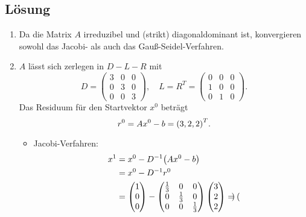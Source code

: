 \documentclass{exercise}
\begin{document}
    \subsection*{Lösung}
    \begin{enumerate}
        \item Da die Matrix \(A\) irreduzibel und (strikt) diagonaldominant ist, konvergieren sowohl das Jacobi- als auch das Gauß-Seidel-Verfahren.
        \item \(A\) lässt sich zerlegen in \(D - L - R\) mit
        \[
            D = \begin{pmatrix}
                3 & 0 & 0\\
                0 & 3 & 0\\
                0 & 0 & 3
            \end{pmatrix}, \quad L = R^T = \begin{pmatrix}
                0 & 0 & 0\\
                1 & 0 & 0\\
                0 & 1 & 0
            \end{pmatrix}.
        \]
        Das Residuum für den Startvektor \(x^0\) beträgt
        \[
            r^0 = Ax^0 - b = \parentheses*{3, 2, 2}^T.
        \]
        \begin{itemize}
            \item Jacobi-Verfahren:
            \begin{align*}
                x^1 &= x^0 - D^{-1}\parentheses*{Ax^0 - b}\\
                &= x^0 - D^{-1}r^0\\
                &= \begin{pmatrix}
                    1\\
                    0\\
                    0
                \end{pmatrix} - \begin{pmatrix}
                    \frac{1}{3} & 0 & 0\\
                    0 & \frac{1}{3} & 0\\
                    0 & 0 & \frac{1}{3}
                \end{pmatrix}\begin{pmatrix}
                    3\\
                    2\\
                    2
                \end{pmatrix} = \begin{pmatrix}

\end{pmatrix}
\end{align*}
\end{itemize}
\end{enumerate}
\end{document}
